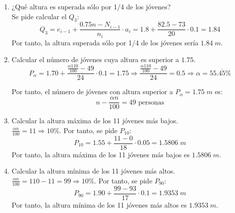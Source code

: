 \begin{ejercicio}
\begin{enumerate}
        \item ¿Qué altura es superada sólo por 1/4 de los jóvenes?\\
        Se pide calcular el $Q_3$:
        $$Q_3 = e_{i-1} + \frac{0.75n - N_{i-1}}{n_i}\cdot a_i
        = 1.8 + \frac{82.5 - 73}{20}\cdot 0.1 = 1.84$$
        Por tanto, la altura superada sólo por 1/4 de los jóvenes sería $1.84\;m$.

        \item Calcular el número de jóvenes cuya altura es superior a $1.75$.
        $$P_{\alpha} = 1.70 + \frac{\frac{\alpha 110}{100} - 49}{24}\cdot 0.1 = 1.75 \Longrightarrow \frac{\frac{\alpha 110}{100} - 49}{24} = 0.5 \Longrightarrow \alpha = 55.\overline{45} \%$$

        Por tanto, el número de jóvenes con altura superior a $P_\alpha = 1.75\;m$ es:
        $$n - \frac{\alpha n}{100} = 49 \text{ personas}$$

        \item Calcular la altura máxima de los 11 jóvenes más bajos.\\
        $\frac{\alpha n}{100} = 11 \Longrightarrow 10\%$. Por tanto, se pide $P_{10}$:
        $$P_{10} = 1.55 + \frac{11-0}{18}\cdot 0.05 = 1.5806 \; m$$
        Por tanto, la altura máxima de los 11 jóvenes más bajos es $1.5806 \; m$.

        \item Calcular la altura mínima de los 11 jóvenes más altos.\\
        $\frac{\alpha n}{100} = 110-11 = 99 \Longrightarrow 10\%$. Por tanto, se pide $P_{90}$:
        $$P_{90} = 1.90 + \frac{99-93}{17}\cdot 0.1 = 1.9353 \; m$$
        Por tanto, la altura mínima de los 11 jóvenes más altos es $1.9353 \; m$.
    \end{enumerate}
\end{ejercicio}

